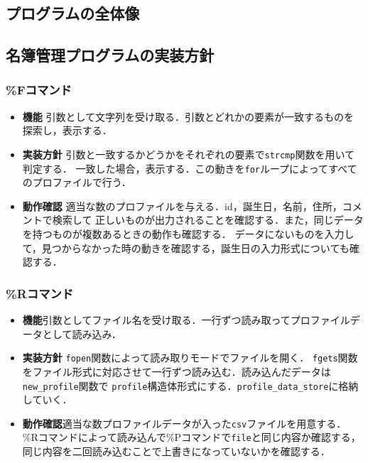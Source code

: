 \subsection{プログラムの全体像}
\subsection{名簿管理プログラムの実装方針}
\subsubsection{\%Fコマンド}
\begin{itemize}
  \item \textbf{機能} 引数として文字列を受け取る．引数とどれかの要素が一致するものを探索し，表示する．
  \item \textbf{実装方針} 引数と一致するかどうかをそれぞれの要素で\texttt{strcmp}関数を用いて判定する．
  一致した場合，表示する．この動きを\texttt{for}ループによってすべてのプロファイルで行う．
  \item \textbf{動作確認} 適当な数のプロファイルを与える．id，誕生日，名前，住所，コメントで検索して
  正しいものが出力されることを確認する．また，同じデータを持つものが複数あるときの動作も確認する．
  データにないものを入力して，見つからなかった時の動きを確認する，誕生日の入力形式についても確認する．
\end{itemize}
\subsubsection{\%Rコマンド}
\begin{itemize}
  \item \textbf{機能}引数としてファイル名を受け取る．一行ずつ読み取ってプロファイルデータとして読み込み．
  \item \textbf{実装方針} \texttt{fopen}関数によって読み取りモードでファイルを開く．
  \texttt{fgets}関数をファイル形式に対応させて一行ずつ読み込む．読み込んだデータは\texttt{new\_profile}関数で
  \texttt{profile}構造体形式にする．\texttt{profile\_data\_store}に格納していく．
  \item \textbf{動作確認}適当な数プロファイルデータが入った\texttt{csv}ファイルを用意する．
  \%Rコマンドによって読み込んで\%Pコマンドで\texttt{file}と同じ内容か確認する，
  同じ内容を二回読み込むことで上書きになっていないかを確認する．
\end{itemize}
\clearpage
